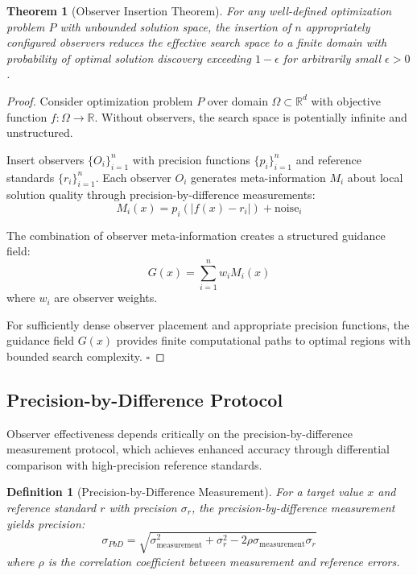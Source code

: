 \documentclass[12pt,a4paper]{article}
\newtheorem{theorem}{Theorem}
\newtheorem{definition}{Definition}
\begin{document}
\begin{theorem}[Observer Insertion Theorem]
For any well-defined optimization problem $P$ with unbounded solution space, the insertion of $n$ appropriately configured observers reduces the effective search space to a finite domain with probability of optimal solution discovery exceeding $1 - \epsilon$ for arbitrarily small $\epsilon > 0$.
\end{theorem}

\begin{proof}
Consider optimization problem $P$ over domain $\Omega \subset \mathbb{R}^d$ with objective function $f: \Omega \to \mathbb{R}$. Without observers, the search space is potentially infinite and unstructured.

Insert observers $\{O_i\}_{i=1}^n$ with precision functions $\{p_i\}_{i=1}^n$ and reference standards $\{r_i\}_{i=1}^n$. Each observer $O_i$ generates meta-information $M_i$ about local solution quality through precision-by-difference measurements:
\begin{equation}
M_i(x) = p_i(|f(x) - r_i|) + \text{noise}_i
\end{equation}

The combination of observer meta-information creates a structured guidance field:
\begin{equation}
G(x) = \sum_{i=1}^n w_i M_i(x)
\end{equation}
where $w_i$ are observer weights.

For sufficiently dense observer placement and appropriate precision functions, the guidance field $G(x)$ provides finite computational paths to optimal regions with bounded search complexity. $\square$
\end{proof}

\subsection{Precision-by-Difference Protocol}

Observer effectiveness depends critically on the precision-by-difference measurement protocol, which achieves enhanced accuracy through differential comparison with high-precision reference standards.

\begin{definition}[Precision-by-Difference Measurement]
For a target value $x$ and reference standard $r$ with precision $\sigma_r$, the precision-by-difference measurement yields precision:
\begin{equation}
\sigma_{PbD} = \sqrt{\sigma_{\text{measurement}}^2 + \sigma_r^2 - 2\rho\sigma_{\text{measurement}}\sigma_r}
\end{equation}
where $\rho$ is the correlation coefficient between measurement and reference errors.
\end{definition}
\end{document}
